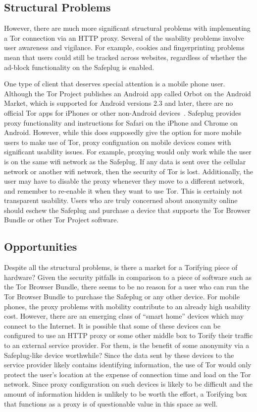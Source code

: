 \documentclass[letterpaper,twocolumn,10pt]{article}
\begin{document}
\subsection{Structural Problems}
However, there are much more significant structural problems with implementing a Tor connection via an HTTP proxy.  Several of the usability problems involve user awareness and vigilance.  For example, cookies and fingerprinting problems mean that users could still be tracked across websites, regardless of whether the ad-block functionality on the Safeplug is enabled.  

One type of client that deserves special attention is a mobile phone user.  Although the Tor Project publishes an Android app called Orbot on the Android Market, which is supported for Android versions 2.3 and later, there are no official Tor apps for iPhones or other non-Android devices~\cite{orbot,amorbot}.  Safeplug provides proxy functionality and instructions for Safari on the iPhone and Chrome on Android.  However, while this does supposedly give the option for more mobile users to make use of Tor, proxy configuation on mobile devices comes with significant usability issues.  For example, proxying would only work while the user is on the same wifi network as the Safeplug.  If any data is sent over the cellular network or another wifi network, then the security of Tor is lost.  Additionally, the user may have to disable the proxy whenever they move to a different network, and remember to re-enable it when they want to use Tor.  This is certainly not transparent usability.  Users who are truly concerned about anonymity online should eschew the Safeplug and purchase a device that supports the Tor Browser Bundle or other Tor Project software.

\subsection{Opportunities}
Despite all the structural problems, is there a market for a Torifying piece of hardware?  Given the security pitfalls in comparison to a piece of software such as the Tor Browser Bundle, there seems to be no reason for a user who can run the Tor Browser Bundle to purchase the Safeplug or any other device.  For mobile phones, the proxy problems with mobility contribute to an already high usability cost.  However, there are an emerging class of ``smart home'' devices which may connect to the Internet.  It is possible that some of these devices can be configured to use an HTTP proxy or some other middle box to Torify their traffic to an external service provider.  For them, is the benefit of some anonymity via a Safeplug-like device worthwhile?  Since the data sent by these devices to the service provider likely contains identifying information, the use of Tor would only protect the user's location at the expense of connection time and load on the Tor network.  Since proxy configuration on such devices is likely to be difficult and the amount of information hidden is unlikely to be worth the effort, a Torifying box that functions as a proxy is of questionable value in this space as well.
\end{document}

